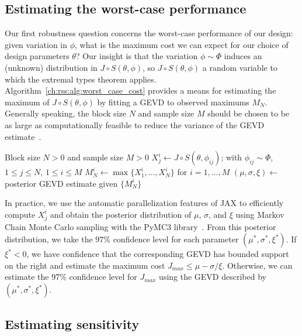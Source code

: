 \subsection{Estimating the worst-case performance}

Our first robustness question concerns the worst-case performance of our design: given variation in $\phi$, what is the maximum cost we can expect for our choice of design parameters $\theta$? Our insight is that the variation $\phi \sim \Phi$ induces an (unknown) distribution in $J \circ S (\theta, \phi)$, so $J \circ S (\theta, \phi)$ a random variable to which the extremal types theorem applies. Algorithm~\ref{ch:rss:alg:worst_case_cost} provides a means for estimating the maximum of $J \circ S (\theta, \phi)$ by fitting a GEVD to observed maximums $M_N$. Generally speaking, the block size $N$ and sample size $M$ should be chosen to be as large as computationally feasible to reduce the variance of the GEVD estimate~\cite{coles_2001}.

\begin{algorithm}
	\caption{An algorithm for estimating the parameters of a GEVD governing the expected maximum cost $J \circ S$}\label{ch:rss:alg:worst_case_cost}
	\begin{algorithmic}
		\Require Block size $N > 0$ and sample size $M > 0$
		\State $X_j^i \gets J\circ S(\theta, \phi_{ij})$; with $\phi_{ij}\sim\Phi$, $1\leq j\leq N$, $1\leq i\leq M$
		\State $M_N^i \gets \max\{X_1^i, \ldots, X_N^i\}$ for $i=1,\ldots,M$
		\State $(\mu, \sigma, \xi) \gets$ posterior GEVD estimate given $\{M_N^i\}$
	\end{algorithmic}
\end{algorithm}

In practice, we use the automatic parallelization features of JAX to efficiently compute $X_j^i$ and obtain the posterior distribution of $\mu$, $\sigma$, and $\xi$ using Markov Chain Monte Carlo sampling with the PyMC3 library~\cite{salvatier_wiecki_fonnesbeck_2016}. From this posterior distribution, we take the $97\%$ confidence level for each parameter $(\mu^*, \sigma^*, \xi^*)$. If $\xi^* < 0$, we have confidence that the corresponding GEVD has bounded support on the right and estimate the maximum cost $J_{max} \leq \mu - \sigma/\xi$. Otherwise, we can estimate the 97\% confidence level for $J_{max}$ using the GEVD described by $(\mu^*, \sigma^*, \xi^*)$.

\subsection{Estimating sensitivity}

